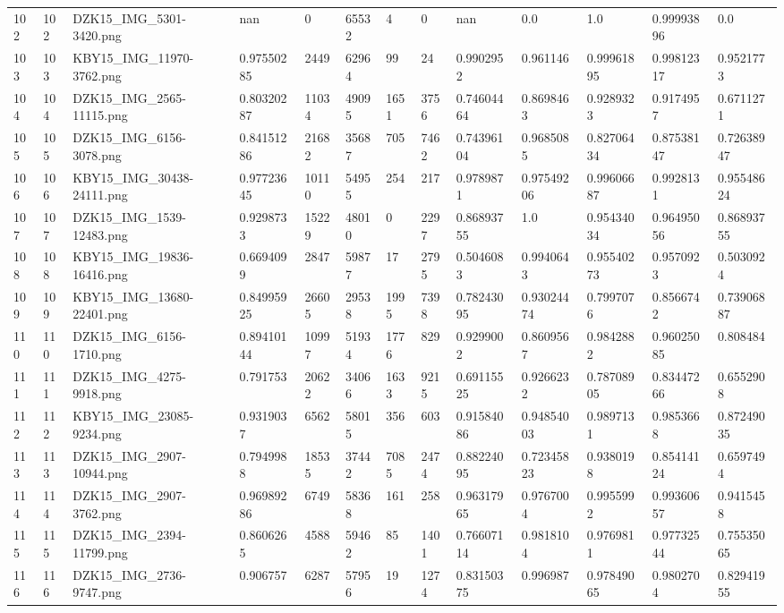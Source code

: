 \documentclass[11pt, a4paper, twoside]{report}
\begin{document}
\begin{longtable}[c]{@{}lllllllllllll@{}}
102 & 102 & DZK15\_IMG\_5301-3420.png & nan & 0 & 65532 & 4 & 0 & nan & 0.0 & 1.0 & 0.99993896 & 0.0 \\
103 & 103 & KBY15\_IMG\_11970-3762.png & 0.97550285 & 2449 & 62964 & 99 & 24 & 0.9902952 & 0.961146 & 0.99961895 & 0.99812317 & 0.9521773 \\
104 & 104 & DZK15\_IMG\_2565-11115.png & 0.80320287 & 11034 & 49095 & 1651 & 3756 & 0.74604464 & 0.8698463 & 0.9289323 & 0.9174957 & 0.6711271 \\
105 & 105 & DZK15\_IMG\_6156-3078.png & 0.84151286 & 21682 & 35687 & 705 & 7462 & 0.74396104 & 0.9685085 & 0.82706434 & 0.87538147 & 0.72638947 \\
106 & 106 & KBY15\_IMG\_30438-24111.png & 0.97723645 & 10110 & 54955 & 254 & 217 & 0.9789871 & 0.97549206 & 0.99606687 & 0.9928131 & 0.95548624 \\
107 & 107 & DZK15\_IMG\_1539-12483.png & 0.9298733 & 15229 & 48010 & 0 & 2297 & 0.86893755 & 1.0 & 0.95434034 & 0.96495056 & 0.86893755 \\
108 & 108 & KBY15\_IMG\_19836-16416.png & 0.6694099 & 2847 & 59877 & 17 & 2795 & 0.5046083 & 0.9940643 & 0.95540273 & 0.9570923 & 0.5030924 \\
109 & 109 & KBY15\_IMG\_13680-22401.png & 0.84995925 & 26605 & 29538 & 1995 & 7398 & 0.78243095 & 0.93024474 & 0.7997076 & 0.8566742 & 0.73906887 \\
110 & 110 & DZK15\_IMG\_6156-1710.png & 0.89410144 & 10997 & 51934 & 1776 & 829 & 0.9299002 & 0.8609567 & 0.9842882 & 0.96025085 & 0.808484 \\
111 & 111 & DZK15\_IMG\_4275-9918.png & 0.791753 & 20622 & 34066 & 1633 & 9215 & 0.69115525 & 0.9266232 & 0.78708905 & 0.83447266 & 0.6552908 \\
112 & 112 & KBY15\_IMG\_23085-9234.png & 0.9319037 & 6562 & 58015 & 356 & 603 & 0.91584086 & 0.94854003 & 0.9897131 & 0.9853668 & 0.87249035 \\
113 & 113 & DZK15\_IMG\_2907-10944.png & 0.7949988 & 18535 & 37442 & 7085 & 2474 & 0.88224095 & 0.72345823 & 0.9380198 & 0.85414124 & 0.6597494 \\
114 & 114 & DZK15\_IMG\_2907-3762.png & 0.96989286 & 6749 & 58368 & 161 & 258 & 0.96317965 & 0.9767004 & 0.9955992 & 0.99360657 & 0.9415458 \\
115 & 115 & DZK15\_IMG\_2394-11799.png & 0.8606265 & 4588 & 59462 & 85 & 1401 & 0.76607114 & 0.9818104 & 0.9769811 & 0.97732544 & 0.75535065 \\
116 & 116 & DZK15\_IMG\_2736-9747.png & 0.906757 & 6287 & 57956 & 19 & 1274 & 0.83150375 & 0.996987 & 0.97849065 & 0.9802704 & 0.82941955 \\

\end{longtable}
\end{document}
